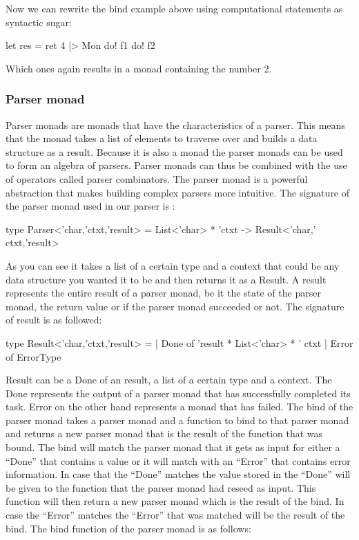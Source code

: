 Now we can rewrite the bind example above using computational statements as syntactic sugar:

\begin{code}
	let res = ret 4 |> Mon {
		do! f1
		do! f2
	} 
\end{code}

Which ones again results in a monad containing the number 2.

\subsubsection{Parser monad}

Parser monads are monads that have the characteristics of a parser. This means that the monad takes a list of elements to traverse over and builds a data structure as a result. Because it is also a monad the parser monads can be used to form an algebra of parsers. Parser monads can thus be combined with the use of operators called parser combinators. The parser monad is a powerful abstraction that makes building complex parsers more intuitive. 
\linebreak
The signature of the parser monad used in our parser is : 

\begin{code}
	type Parser<'char,'ctxt,'result> = List<'char> * 'ctxt -> Result<'char,' ctxt,'result> 
\end{code}

As you can see it takes a list of a certain type and a context that could be any data structure you wanted it to be and then returns it as a Result. A result represents the entire result of a parser monad, be it the state of the parser monad, the return value or if the parser monad succeeded or not.
\linebreak
The signature of result is as followed: 

\begin{code}
	type Result<'char,'ctxt,'result> = | Done of 'result * List<'char> * ' ctxt | Error of ErrorType 
\end{code}

Result can be a Done of an result, a list of a certain type and a context. The Done represents the output of a parser monad that has successfully completed its task. Error on the other hand represents a monad that has failed. 
\linebreak
The bind of the parser monad takes a parser monad and a function to bind to that parser monad and returns a new parser monad that is the result of the function that was bound. The bind will match the parser monad that it gets as input for either a “Done” that contains a value or it will match with an “Error” that contains error information.
In case that the “Done” matches the value stored in the “Done” will be given to the function that the parser monad had reseed as input. This function will then return a new parser monad which is the result of the bind. In case the “Error” matches the “Error” that was matched will be the result of the bind.
\linebreak
The bind function of the parser monad is as follows:

